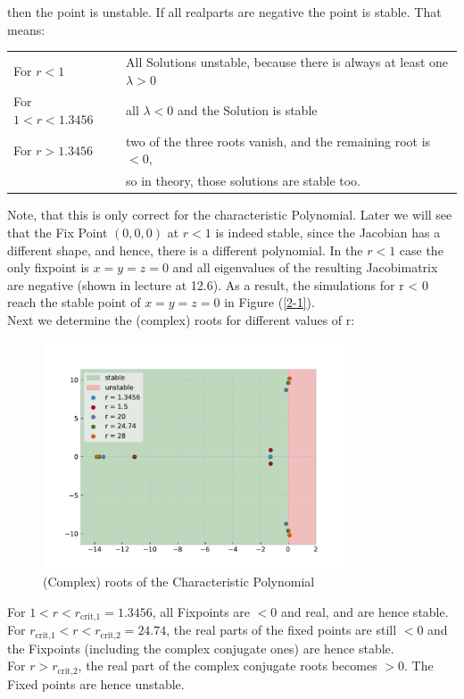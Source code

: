 \documentclass{article}
\begin{document}
then the point is unstable. If all realparts are negative the point is stable.
That means:
\begin{table}[H]
    \centering
    \begin{tabular}{ll}
    For $ r < 1 $ & All Solutions unstable, because there is always at least
    one \( \lambda > 0 \) \\ 
    For $ 1 < r < 1.3456 $ & all \( \lambda < 0 \) and the Solution is stable \\
    For $ r > 1.3456 $ & two of the three roots vanish, and the remaining root
    is $ < 0 $, \\ & so in theory, those solutions are stable too.
    \end{tabular}
\end{table}
Note, that this is only correct for the characteristic Polynomial. Later we will
see that the Fix Point \( (0,0,0) \) at \( r < 1 \) is indeed stable, since
the Jacobian has a different shape, and hence, there is a different polynomial.
In the \( r < 1 \)  case the only fixpoint is $x=y=z=0$ and all eigenvalues of
the resulting Jacobimatrix are negative (shown in
lecture at 12.6). As a result, the simulations for r < 0 reach the
stable point of $x=y=z=0$ in Figure (\ref{2-1}). \\[.5cm]

Next we determine the (complex) roots for different values of r:
\begin{figure}[H]
    \centering
    \includegraphics[width=9cm]{Figure1-2.pdf} 
    \caption{(Complex) roots of the Characteristic Polynomial} 
\end{figure}
For \( 1 < r < r_\text{crit,1} = 1.3456 \), all Fixpoints are \( < 0 \) and real,
and are hence stable.\\
For \(  r_\text{crit,1} < r < r_\text{crit,2} = 24.74\), the real parts of the
fixed points are still \( < 0 \) and the Fixpoints (including the complex
conjugate ones) are hence stable. \\
For \( r > r_\text{crit,2} \), the real part of the complex conjugate roots
becomes \( > 0 \). The Fixed points are hence unstable. \\
\end{document}
